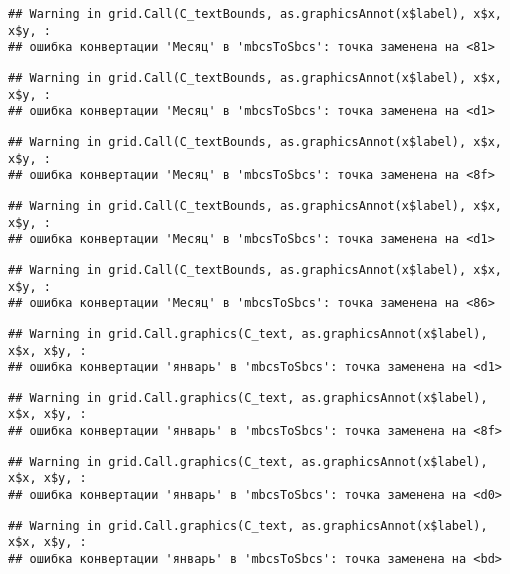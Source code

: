 \documentclass[
]{article}
\begin{document}
\begin{verbatim}
## Warning in grid.Call(C_textBounds, as.graphicsAnnot(x$label), x$x, x$y, :
## ошибка конвертации 'Месяц' в 'mbcsToSbcs': точка заменена на <81>
\end{verbatim}

\begin{verbatim}
## Warning in grid.Call(C_textBounds, as.graphicsAnnot(x$label), x$x, x$y, :
## ошибка конвертации 'Месяц' в 'mbcsToSbcs': точка заменена на <d1>
\end{verbatim}

\begin{verbatim}
## Warning in grid.Call(C_textBounds, as.graphicsAnnot(x$label), x$x, x$y, :
## ошибка конвертации 'Месяц' в 'mbcsToSbcs': точка заменена на <8f>
\end{verbatim}

\begin{verbatim}
## Warning in grid.Call(C_textBounds, as.graphicsAnnot(x$label), x$x, x$y, :
## ошибка конвертации 'Месяц' в 'mbcsToSbcs': точка заменена на <d1>
\end{verbatim}

\begin{verbatim}
## Warning in grid.Call(C_textBounds, as.graphicsAnnot(x$label), x$x, x$y, :
## ошибка конвертации 'Месяц' в 'mbcsToSbcs': точка заменена на <86>
\end{verbatim}

\begin{verbatim}
## Warning in grid.Call.graphics(C_text, as.graphicsAnnot(x$label), x$x, x$y, :
## ошибка конвертации 'январь' в 'mbcsToSbcs': точка заменена на <d1>
\end{verbatim}

\begin{verbatim}
## Warning in grid.Call.graphics(C_text, as.graphicsAnnot(x$label), x$x, x$y, :
## ошибка конвертации 'январь' в 'mbcsToSbcs': точка заменена на <8f>
\end{verbatim}

\begin{verbatim}
## Warning in grid.Call.graphics(C_text, as.graphicsAnnot(x$label), x$x, x$y, :
## ошибка конвертации 'январь' в 'mbcsToSbcs': точка заменена на <d0>
\end{verbatim}

\begin{verbatim}
## Warning in grid.Call.graphics(C_text, as.graphicsAnnot(x$label), x$x, x$y, :
## ошибка конвертации 'январь' в 'mbcsToSbcs': точка заменена на <bd>
\end{verbatim}
\end{document}
